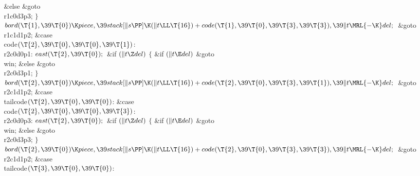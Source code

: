 \2\&{else}\1\5
\&{goto} \\{r1c0d3p3};\5
\2${}\}{}$\2\6
${}\\{bord}(\T{1},\39\T{0})\K\\{piece},\39\\{stack}[\|s\PP]\K(\|t\LL\T{16})+%
\\{code}(\T{1},\39\T{0},\39\T{3},\39\T{3}),\39\|t\MRL{-{\K}}\\{del};{}$\6
\&{goto} \\{r1c1d1p2};\6
\4\&{case} \\{code}${}(\T{2},\39\T{0},\39\T{0},\39\T{1}){}$:\5
\\{r2c0d0p1}:\5
${}\\{east}(\T{2},\39\T{0});{}$\6
\&{if} ${}(\|t\Z\\{del}){}$\5
${}\{{}$\5
\1\&{if} ${}(\|t\E\\{del}){}$\1\5
\&{goto} \\{win};\5
\2\&{else}\1\5
\&{goto} \\{r2c0d3p1};\5
\2${}\}{}$\2\6
${}\\{bord}(\T{2},\39\T{0})\K\\{piece},\39\\{stack}[\|s\PP]\K(\|t\LL\T{16})+%
\\{code}(\T{2},\39\T{0},\39\T{3},\39\T{1}),\39\|t\MRL{-{\K}}\\{del};{}$\6
\&{goto} \\{r2c1d1p2};\6
\4\&{case} \\{tailcode}${}(\T{2},\39\T{0},\39\T{0}){}$:\5
\&{case} \\{code}${}(\T{2},\39\T{0},\39\T{0},\39\T{3}){}$:\5
\\{r2c0d0p3}:\5
${}\\{east}(\T{2},\39\T{0});{}$\6
\&{if} ${}(\|t\Z\\{del}){}$\5
${}\{{}$\5
\1\&{if} ${}(\|t\E\\{del}){}$\1\5
\&{goto} \\{win};\5
\2\&{else}\1\5
\&{goto} \\{r2c0d3p3};\5
\2${}\}{}$\2\6
${}\\{bord}(\T{2},\39\T{0})\K\\{piece},\39\\{stack}[\|s\PP]\K(\|t\LL\T{16})+%
\\{code}(\T{2},\39\T{0},\39\T{3},\39\T{3}),\39\|t\MRL{-{\K}}\\{del};{}$\6
\&{goto} \\{r2c1d1p2};\6
\4\&{case} \\{tailcode}${}(\T{3},\39\T{0},\39\T{0}){}$:\5
